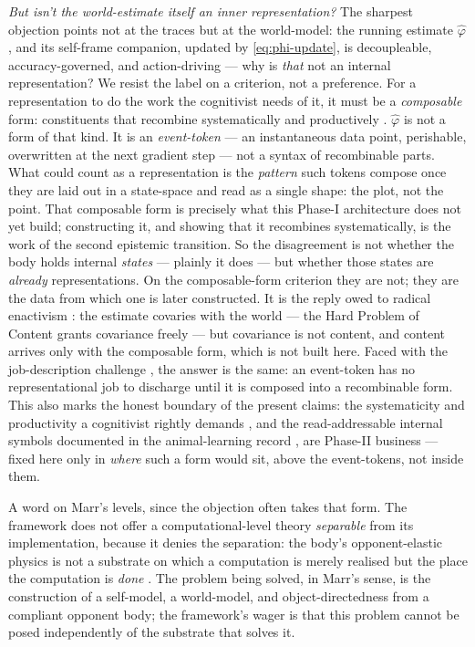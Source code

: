 \documentclass{article}
\begin{document}
\emph{But isn't the world-estimate itself an inner representation?}  The
sharpest objection points not at the traces but at the world-model: the running
estimate $\hat\varphi$, and its self-frame companion, updated by
\eqref{eq:phi-update}, is decoupleable, accuracy-governed, and action-driving
--- why is \emph{that} not an internal representation?  We resist the label on a
criterion, not a preference.  For a representation to do the work the cognitivist
needs of it, it must be a \emph{composable} form: constituents that recombine
systematically and productively \citep{FodorPylyshyn1988Systematicity}.
$\hat\varphi$ is not a form of that kind.  It is an \emph{event-token} --- an
instantaneous data point, perishable, overwritten at the next gradient step ---
not a syntax of recombinable parts.  What could count as a representation is the
\emph{pattern} such tokens compose once they are laid out in a state-space and
read as a single shape: the plot, not the point.  That composable form is
precisely what this Phase-I architecture does not yet build; constructing it, and
showing that it recombines systematically, is the work of the second epistemic
transition.  So the disagreement is not whether the body holds internal
\emph{states} --- plainly it does --- but whether those states are
\emph{already} representations.  On the composable-form criterion they are not;
they are the data from which one is later constructed.  It is the reply owed to
radical enactivism \citep{HuttoMyin2013RadicalizingEnactivism}: the estimate
covaries with the world --- the Hard Problem of Content grants covariance freely
--- but covariance is not content, and content arrives only with the composable
form, which is not built here.  Faced with the job-description challenge
\citep{Ramsey2007RepresentationReconsidered}, the answer is the same: an
event-token has no representational job to discharge until it is composed into a
recombinable form.  This also marks the
honest boundary of the present claims: the systematicity and productivity a
cognitivist rightly demands \citep{FodorPylyshyn1988Systematicity}, and the
read-addressable internal symbols documented in the animal-learning record
\citep{GallistelKing2009}, are Phase-II business --- fixed here only in
\emph{where} such a form would sit, above the event-tokens, not inside them.

A word on Marr's levels, since the objection often takes that form.  The
framework does not offer a computational-level theory \emph{separable} from its
implementation, because it denies the separation: the body's opponent-elastic
physics is not a substrate on which a computation is merely realised but the
place the computation is \emph{done} \citep{Marr1982Vision}.  The problem being
solved, in Marr's sense, is the construction of a self-model, a world-model, and
object-directedness from a compliant opponent body; the framework's wager is
that this problem cannot be posed independently of the substrate that solves it.
\end{document}
